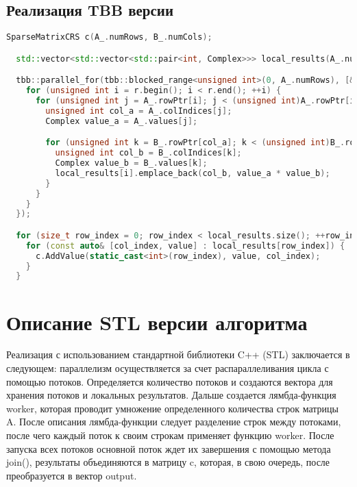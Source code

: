\documentclass[14pt,a4paper]{extarticle}
\begin{document}
\subsection*{Реализация TBB версии}
\begin{lstlisting}[language=C++]
  SparseMatrixCRS c(A_.numRows, B_.numCols);

  std::vector<std::vector<std::pair<int, Complex>>> local_results(A_.numRows);

  tbb::parallel_for(tbb::blocked_range<unsigned int>(0, A_.numRows), [&](const tbb::blocked_range<unsigned int>& r) {
    for (unsigned int i = r.begin(); i < r.end(); ++i) {
      for (unsigned int j = A_.rowPtr[i]; j < (unsigned int)A_.rowPtr[i + 1]; ++j) {
        unsigned int col_a = A_.colIndices[j];
        Complex value_a = A_.values[j];

        for (unsigned int k = B_.rowPtr[col_a]; k < (unsigned int)B_.rowPtr[col_a + 1]; ++k) {
          unsigned int col_b = B_.colIndices[k];
          Complex value_b = B_.values[k];
          local_results[i].emplace_back(col_b, value_a * value_b);
        }
      }
    }
  });

  for (size_t row_index = 0; row_index < local_results.size(); ++row_index) {
    for (const auto& [col_index, value] : local_results[row_index]) {
      c.AddValue(static_cast<int>(row_index), value, col_index);
    }
  }
\end{lstlisting}

\section{Описание STL версии алгоритма}

Реализация с использованием стандартной библиотеки C++ (STL) заключается в следующем: параллелизм осуществляется за счет распараллеливания цикла с помощью потоков. Определяется количество потоков и создаются вектора для хранения потоков и локальных результатов. Дальше создается лямбда-функция worker, которая проводит умножение определенного количества строк матрицы A. После описания лямбда-функции следует разделение строк между потоками, после чего каждый поток к своим строкам применяет функцию worker. После запуска всех потоков основной поток ждет их завершения с помощью метода join(), результаты объединяются в матрицу c, которая, в свою очередь, после преобразуется в вектор output.
\end{document}
